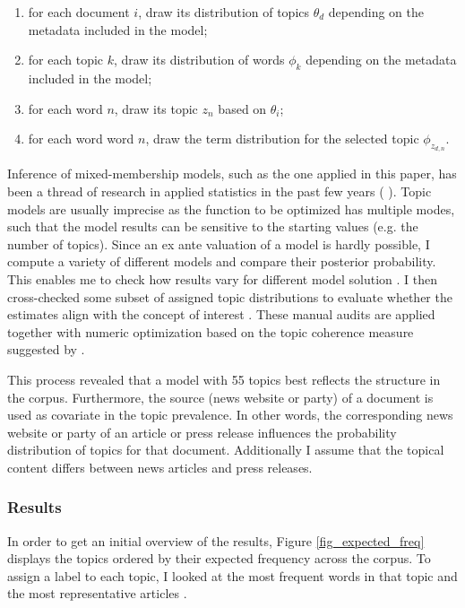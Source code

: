 \documentclass[12pt,a4paper,notitlepage]{article}
\begin{document}
\begin{enumerate}
	\item for each document $i$, draw its distribution of topics $\theta_d$ depending on the metadata included in the model; 
	\item for each topic $k$, draw its distribution of words $\phi_k$ depending on the metadata included in the model;
	\item for each word $n$, draw its topic $z_n$ based on $\theta_i$;
	\item for each word word $n$, draw the term distribution for the selected topic $\phi_{z_{d,n}}$.
\end{enumerate}

Inference of mixed-membership models, such as the one applied in this paper, has been a thread of research in applied statistics in the past few years (\citet{blei_latent_2003} \citet{erosheva_mixed-membership_2004} \citet{braun_variational_2010}). Topic models are usually imprecise as the function to be optimized has multiple modes, such that the model results can be sensitive to the starting values (e.g. the number of topics). Since an ex ante valuation of a model is hardly possible, I compute a variety of different models and compare their posterior probability. This enables me to check how results vary for different model solution \citep{roberts_navigating_2016}. I then cross-checked some subset of assigned topic distributions to evaluate whether the estimates align with the concept of interest \citep{gentzkow_text_2017}. These manual audits are applied together with numeric optimization based on the topic coherence measure suggested by \citet{mimno_optimizing_2011}. 

This process revealed that a model with 55 topics best reflects the structure in the corpus. Furthermore, the source (news website or party) of a document is used as covariate in the topic prevalence. In other words, the corresponding news website or party of an article or press release influences the probability distribution of topics for that document. Additionally I assume that the topical content differs between news articles and press releases. 

\subsubsection{Results}
In order to get an initial overview of the results, Figure \ref{fig_expected_freq} displays the topics ordered by their expected frequency across the corpus. To assign a label to each topic, I looked at the most frequent words in that topic and the most representative articles \citep{roberts_model_2016}. 
\end{document}
